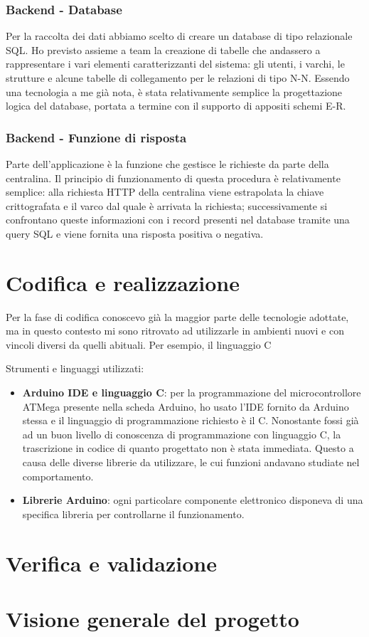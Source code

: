 \subsubsection{Backend - Database}
Per la raccolta dei dati abbiamo scelto di creare un database di tipo relazionale SQL.
Ho previsto assieme a team la creazione di tabelle che andassero a rappresentare i vari elementi caratterizzanti del sistema: gli utenti, i varchi, le strutture e alcune tabelle di collegamento per le relazioni di tipo N-N.
Essendo una tecnologia a me già nota, è stata relativamente semplice la progettazione logica del database, portata a termine con il supporto di appositi schemi E-R.

\subsubsection{Backend - Funzione di risposta}
Parte dell'applicazione è la funzione che gestisce le richieste da parte della centralina. Il principio di funzionamento di questa procedura è relativamente semplice: alla richiesta HTTP della centralina viene estrapolata la chiave crittografata e il varco dal quale è arrivata la richiesta; successivamente si confrontano queste informazioni con i record presenti nel database tramite una query SQL e viene fornita una risposta positiva o negativa. 

\section{Codifica e realizzazione}
Per la fase di codifica conoscevo già la maggior parte delle tecnologie adottate, ma in questo contesto mi sono ritrovato ad utilizzarle in ambienti nuovi e con vincoli diversi da quelli abituali. Per esempio, il linguaggio C 

Strumenti e linguaggi utilizzati:
\begin{itemize}
\item \textbf{Arduino IDE e linguaggio C}: per la programmazione del microcontrollore ATMega presente nella scheda Arduino, ho usato l'IDE fornito da Arduino stessa e il linguaggio di programmazione richiesto è il C. Nonostante fossi già ad un buon livello di conoscenza di programmazione con linguaggio C, la trascrizione in codice di quanto progettato non è stata immediata. Questo a causa delle diverse librerie da utilizzare, le cui funzioni andavano studiate nel comportamento.
\item \textbf{Librerie Arduino}: ogni particolare componente elettronico disponeva di una specifica libreria per controllarne il funzionamento. 
\end{itemize}

\section{Verifica e validazione}

\section{Visione generale del progetto}